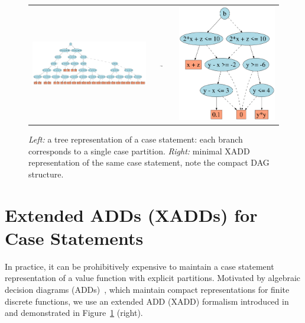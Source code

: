 \documentclass{article} %
\begin{document}
\begin{figure}[t!]
\begin{center}
\begin{tabular}{m{}m{}m{}}
\includegraphics[width=.70\textwidth]{norm_unif_tree}  & 
\vspace{-.8cm} \hspace{-7mm} \large $\underrightarrow{\qquad}$ & 
\includegraphics[width=.20\textwidth]{norm_unif}
\end{tabular}

\end{center}
\caption{\footnotesize {\it Left:} a tree representation of a case statement: each branch corresponds to a single case partition.  {\it Right:} minimal XADD
representation of the same case statement, note the compact DAG 
structure.} \label{fig:xadd_tree}
\end{figure}

\section{Extended ADDs (XADDs) for Case Statements}

\label{sec:xadd}

In practice, it can be prohibitively expensive to maintain a case
statement representation of a value function with explicit partitions.
Motivated by algebraic decision diagrams (ADDs)~\cite{bahar93add},
which maintain compact representations for finite discrete functions,
we use an extended ADD (XADD) formalism introduced 
in~\cite{uai11} and demonstrated in 
Figure~\ref{fig:xadd_tree} (right).
\end{document}
